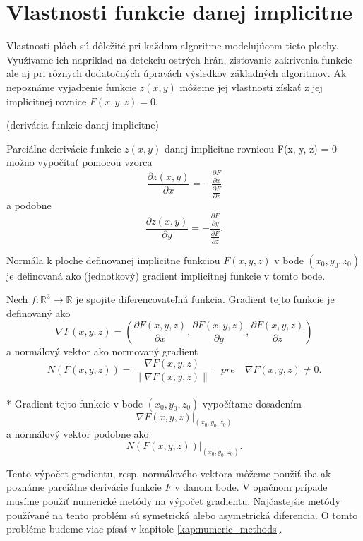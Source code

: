 \newpage

\section{Vlastnosti funkcie danej implicitne}

Vlastnosti plôch sú dôležité pri každom algoritme modelujúcom tieto plochy. Využívame ich napríklad na detekciu ostrých hrán, 
zisťovanie zakrivenia funkcie ale aj pri rôznych dodatočných úpravách výsledkov základných algoritmov.
Ak nepoznáme vyjadrenie funkcie $z(x, y)$ môžeme jej vlastnosti získať z jej implicitnej rovnice $F(x, y, z) = 0$.


\begin{theorem}
    (derivácia funkcie danej implicitne)

    Parciálne derivácie funkcie $z(x, y)$ danej implicitne rovnicou F(x, y, z) = 0 možno vypočítať pomocou vzorca
    $$\frac{\partial z(x, y)}{\partial x} = -\frac{\frac{\partial F}{\partial x}}{\frac{\partial F}{\partial z}}$$
    a podobne 
    $$\frac{\partial z(x, y)}{\partial y} = -\frac{\frac{\partial F}{\partial y}}{\frac{\partial F}{\partial z}}.$$
\end{theorem}

Normála k ploche definovanej implicitne funkciou $F(x,y,z)$ v bode $(x_0, y_0, z_0)$ je definovaná ako (jednotkový) 
gradient implicitnej funkcie  v tomto bode.

\begin{definition}
    Nech $f : \mathbb{R}^3 \to \mathbb{R}$ je spojite diferencovateľná funkcia. Gradient tejto 
    funkcie je definovaný ako 
    $$\nabla F(x, y, z) = (\frac{\partial F(x, y, z)}{\partial x}, \frac{\partial F(x, y, z)}{\partial y}, 
    \frac{\partial F(x, y, z)}{\partial z})$$
    a normálový vektor ako normovaný gradient
    $$N(F(x, y, z))  = \frac{\nabla F(x, y, z)}{\| \nabla F(x, y, z) \|} \,\,\,\,\,\, pre \,\,\,\,\,\,
    \nabla F(x,y,z) \neq 0.$$
    \\*
    Gradient tejto funkcie v bode $(x_0, y_0, z_0)$ vypočítame dosadením 
    $$\nabla F(x, y, z)\big|_{(x_0, y_0, z_0)}$$ 
    a normálový vektor podobne ako $$N(F(x, y, z))\big|_{(x_0, y_0, z_0)}.$$
\end{definition}

Tento výpočet gradientu, resp. normálového vektora môžeme použiť iba ak poznáme parciálne derivácie funkcie $F$ v danom bode.
V opačnom prípade musíme použiť numerické metódy na výpočet gradientu. Najčastejšie metódy používané na tento problém sú 
symetrická alebo asymetrická diferencia. O tomto probléme budeme viac písať v kapitole \ref{kap:numeric_methods}.

